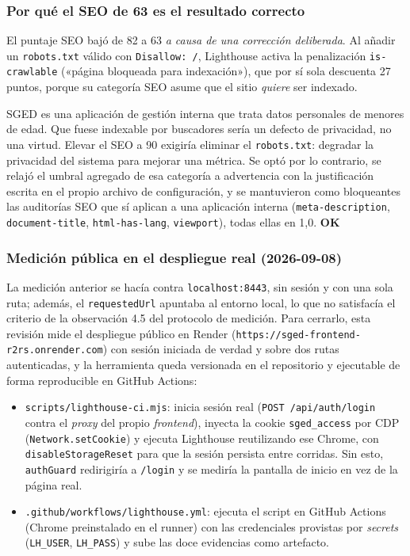 \documentclass[11pt,a4paper]{article}
\newcommand{\ruta}[1]{\texttt{\footnotesize #1}}
\newcommand{\ok}{\textcolor{okverde}{\textbf{OK}}}
\begin{document}
\subsubsection{Por qué el SEO de 63 es el resultado correcto}
\label{sec:seo}

El puntaje SEO bajó de 82 a 63 \emph{a causa de una corrección deliberada}.
Al añadir un \ruta{robots.txt} válido con \texttt{Disallow: /}, Lighthouse
activa la penalización \texttt{is-crawlable} («página bloqueada para
indexación»), que por sí sola descuenta 27 puntos, porque su categoría SEO
asume que el sitio \emph{quiere} ser indexado.

SGED es una aplicación de gestión interna que trata datos personales de
menores de edad. Que fuese indexable por buscadores sería un defecto de
privacidad, no una virtud. Elevar el SEO a 90 exigiría eliminar el
\ruta{robots.txt}: degradar la privacidad del sistema para mejorar una
métrica. Se optó por lo contrario, se relajó el umbral agregado de esa
categoría a advertencia con la justificación escrita en el propio archivo de
configuración, y se mantuvieron como bloqueantes las auditorías SEO que sí
aplican a una aplicación interna (\texttt{meta-description},
\texttt{document-title}, \texttt{html-has-lang}, \texttt{viewport}), todas
ellas en 1,0. \ok

\subsubsection{Medición pública en el despliegue real (2026-09-08)}
\label{sec:lighthouse-public}

La medición anterior se hacía contra \texttt{localhost:8443}, sin sesión
y con una sola ruta; además, el \texttt{requestedUrl} apuntaba al
entorno local, lo que no satisfacía el criterio de la observación 4.5
del protocolo de medición. Para cerrarlo, esta revisión mide el
despliegue público en Render (\texttt{https://sged-frontend-r2rs.onrender.com})
con sesión iniciada de verdad y sobre dos rutas autenticadas, y la
herramienta queda versionada en el repositorio y ejecutable de forma
reproducible en GitHub Actions:

\begin{itemize}
  \item \ruta{scripts/lighthouse-ci.mjs}: inicia sesión real
  (\texttt{POST /api/auth/login} contra el \emph{proxy} del propio
  \emph{frontend}), inyecta la cookie \texttt{sged\_access} por CDP
  (\texttt{Network.setCookie}) y ejecuta Lighthouse reutilizando ese
  Chrome, con \texttt{disableStorageReset} para que la sesión persista
  entre corridas. Sin esto, \texttt{authGuard} redirigiría a
  \texttt{/login} y se mediría la pantalla de inicio en vez de la
  página real.
  \item \ruta{.github/workflows/lighthouse.yml}: ejecuta el script en
  GitHub Actions (Chrome preinstalado en el runner) con las
  credenciales provistas por \emph{secrets} (\texttt{LH\_USER},
  \texttt{LH\_PASS}) y sube las doce evidencias como artefacto.
\end{itemize}
\end{document}
